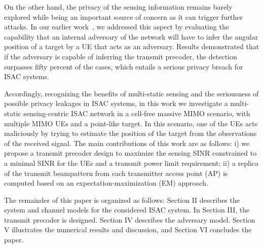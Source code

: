 \documentclass[conference,twocolumn,a4paper]{IEEEtran}
\theoremstyle{remark} \newtheorem{remark}{Remark}
\begin{document}
On the other hand, the privacy of the sensing information remains barely explored while being an important source of concern as it can trigger further attacks. In our earlier work~\cite{dasilva2023privacy}, we addressed this aspect by evaluating the capability that an internal adversary of the network will have to infer the angular position of a target by a UE that acts as an adversary. Results demonstrated that if the adversary is capable of inferring the transmit precoder, the detection surpasses fifty percent of the cases, which entails a serious privacy breach for ISAC systems. 

Accordingly, recognizing the benefits of multi-static sensing and the seriousness of possible privacy leakages in ISAC systems, in this work we investigate a multi-static sensing-centric ISAC network in a cell-free massive MIMO scenario, with multiple MIMO UEs and a point-like target. In this scenario, one of the UEs acts maliciously by trying to estimate the position of the target from the observations of the received signal. The main contributions of this work are as follows: i) we propose a transmit precoder design to maximize the sensing SINR constrained to a minimal SINR for the UEs and a transmit power limit requirement; ii) a replica of the transmit beampattern from each transmitter access point (AP) is computed based on an expectation-maximization (EM) approach. 

The remainder of this paper is organized as follows: Section II describes the system and channel models for the considered ISAC system. In Section III, the transmit precoder is designed. Section IV describes the adversary model. Section V illustrates the numerical results and discussion, and Section VI concludes the paper.
\end{document}
